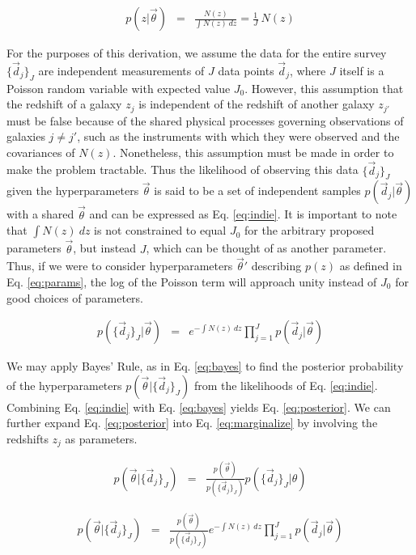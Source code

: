 \documentclass[preprint]{aastex}
\begin{document}
\begin{eqnarray}
\label{eq:params}
p(z|\vec{\theta}) &=& \frac{N(z)}{\int N(z)\ dz} = \frac{1}{J}\ N(z)
\end{eqnarray}

For the purposes of this derivation, we assume the data for the entire survey $\{\vec{d}_{j}\}_{J}$ are independent measurements of $J$ data points $\vec{d}_{j}$, where $J$ itself is a Poisson random variable with expected value $J_{0}$.  However, this assumption that the redshift of a galaxy $z_{j}$ is independent of the redshift of another galaxy $z_{j'}$ must be false because of the shared physical processes governing observations of galaxies $j\neq j'$, such as the instruments with which they were observed and the covariances of $N(z)$.  Nonetheless, this assumption must be made in order to make the problem tractable.  Thus the likelihood of observing this data $\{\vec{d}_{j}\}_{J}$ given the hyperparameters $\vec{\theta}$ is said to be a set of independent samples $p(\vec{d}_{j}|\vec{\theta})$ with a shared $\vec{\theta}$ and can be expressed as Eq. \ref{eq:indie}.  \citep{for14}  It is important to note that $\int N(z)\ dz$ is not constrained to equal $J_{0}$ for the arbitrary proposed parameters $\vec{\theta}$, but instead $J$, which can be thought of as another parameter.  Thus, if we were to consider hyperparameters $\vec{\theta}'$ describing $p(z)$ as defined in Eq. \ref{eq:params}, the log of the Poisson term will approach unity instead of $J_{0}$ for good choices of parameters.

\begin{eqnarray}
\label{eq:indie}
p(\{\vec{d}_{j}\}_{J}|\vec{\theta}) &=& e^{-\int N(z)\ dz}\prod_{j=1}^{J}p(\vec{d}_{j}|\vec{\theta})
\end{eqnarray}

We may apply Bayes' Rule, as in Eq. \ref{eq:bayes} to find the posterior probability of the hyperparameters $p(\vec{\theta}|\{\vec{d}_{j}\}_{J})$ from the likelihoods of Eq. \ref{eq:indie}.  Combining Eq. \ref{eq:indie} with Eq. \ref{eq:bayes} yields Eq. \ref{eq:posterior}.  We can further expand Eq. \ref{eq:posterior} into Eq. \ref{eq:marginalize} by involving the redshifts $z_{j}$ as parameters.  

\begin{eqnarray}
\label{eq:bayes}
p(\vec{\theta}|\{\vec{d}_{j}\}_{J}) &=& \frac{p(\vec{\theta})}{p(\{\vec{d}_{j}\}_{J})}p(\{\vec{d}_{j}\}_{J}|\theta)
\end{eqnarray}

\begin{eqnarray}
\label{eq:posterior}
p(\vec{\theta}|\{\vec{d}_{j}\}_{J}) &=& \frac{p(\vec{\theta})}{p(\{\vec{d}_{j}\}_{J})}e^{-\int N(z)\ dz}\prod_{j=1}^{J}p(\vec{d}_{j}|\vec{\theta})
\end{eqnarray}
\end{document}
